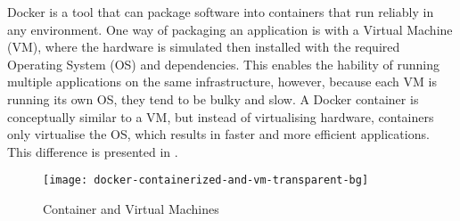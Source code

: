 Docker is a tool that can package software into containers that run reliably in any environment. One way of packaging an application is with a Virtual Machine (VM), where the hardware is simulated then installed with the required Operating System (OS) and dependencies. This enables the hability of running multiple applications on the same infrastructure, however, because each VM is running its own OS, they tend to be bulky and slow. A Docker container is conceptually similar to a VM, but instead of virtualising hardware, containers only virtualise the OS, which results in faster and more efficient applications. This difference is presented in .

\begin{figure*}[!htb]
  \caption{Container and Virtual Machines}
  \label{fig:docker_container_vm}
  \centering
  \texttt{[image: docker-containerized-and-vm-transparent-bg]}
\end{figure*}
